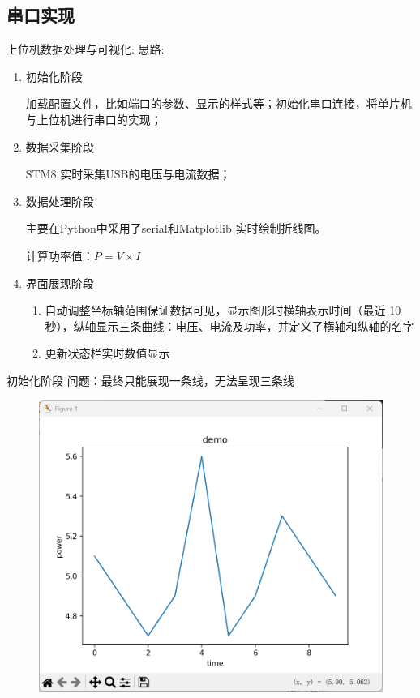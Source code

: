 \documentclass{ctexart}
\begin{document}
\subsection{串口实现}
上位机数据处理与可视化:
思路:
  \begin{enumerate}
    \item 初始化阶段

    加载配置文件，比如端口的参数、显示的样式等；初始化串口连接，将单片机与上位机进行串口的实现；

    \item 数据采集阶段

    STM8 实时采集USB的电压与电流数据；

    \item 数据处理阶段

    主要在Python中采用了serial和Matplotlib 实时绘制折线图。

    计算功率值：$P = V \times I$

    \item 界面展现阶段
    \begin{enumerate}
      \item 自动调整坐标轴范围保证数据可见，显示图形时横轴表示时间（最近 10 秒），纵轴显示三条曲线：电压、电流及功率，并定义了横轴和纵轴的名字
      \item 更新状态栏实时数值显示
    \end{enumerate}

  \end{enumerate}初始化阶段
问题：最终只能展现一条线，无法呈现三条线
\begin{figure}[H]
\includegraphics[width=.4\textwidth]{./figures/fig.png}
\end{figure}
\end{document}
